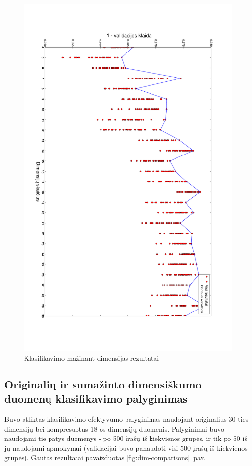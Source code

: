 \documentclass{VUMIFPSbakalaurinis}
\begin{document}
\begin{figure}[h]
	\centering
	\centerline{\includegraphics[scale=0.37]{pics/dimensions_2015-5-27_6-18-5}}
	\caption{Klasifikavimo mažinant dimensijas rezultatai}
	\label{fig:experiment-2}
\end{figure}


\subsection{Originalių ir sumažinto dimensiškumo duomenų klasifikavimo palyginimas}

Buvo atliktas klasifikavimo efektyvumo palyginimas naudojant originalius 30-ties dimensijų bei kompresuotus 18-os dimensijų duomenis.
Palyginimui buvo naudojami tie patys duomenys - po 500 įrašų iš kiekvienos grupės, ir tik po 50 iš jų naudojami apmokymui (validacijai buvo panaudoti visi 500 įrašų iš kiekvienos grupės).
Gautas rezultatai pavaizduotas \ref{fig:dim-comparisons}~pav.
\end{document}
